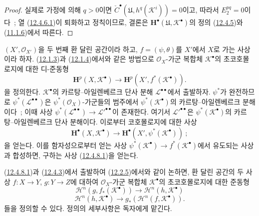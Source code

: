\begin{proof}
실제로 가정에 의해 $q>0$이면
$\check C^\bullet(\mathfrak U,h^q(\mathcal K^i))=0$이고, 따라서
$E_2^{pq}=0$이다~; 열 (\hyperref[0.12.4.6.1-fr]{12.4.6.1})이 퇴화하고
정칙이므로, 결론은 $\mathbf H^\bullet(\mathfrak U,\mathcal K^\bullet)$의
정의 (\hyperref[0.12.4.5-fr]{12.4.5})와
(\hyperref[0.11.1.6-fr]{11.1.6})에서 따른다.
\end{proof}

\begin{env}[12.4.8]
\label{0.12.4.8-fr}
$(X',\mathcal O_{X'})$을 두 번째 환 달린 공간이라 하고,
$f=(\psi,\theta)$를 $X'$에서 $X$로 가는 사상이라 하자.
(\hyperref[0.12.1.3-fr]{12.1.3})과
(\hyperref[0.12.1.4-fr]{12.1.4})에서와 같은 방법으로
$\mathcal O_X$-가군 복합체 $\mathcal K^\bullet$의 초코호몰로지에 대한
디-준동형
\begin{equation}
\label{0.12.4.8.1-fr}
\tag{12.4.8.1}
\mathbf H^p(X,\mathcal K^\bullet)
\longrightarrow\mathbf H^p(X',f^*(\mathcal K^\bullet)).
\end{equation}
을 정의한다. $\mathcal K^\bullet$의 카르탕--아일렌베르크 단사 분해
$\mathcal L^{\bullet\bullet}$에서 출발하자. $\psi^*$가 완전하므로
$\psi^*(\mathcal L^{\bullet\bullet})$은 $\psi^*(\mathcal O_X)$-가군들의
범주에서 $\psi^*(\mathcal K^\bullet)$의 카르탕--아일렌베르크 분해이다~;
이때 사상
$\psi^*(\mathcal L^{\bullet\bullet})\to
\mathcal L'^{\bullet\bullet}$이 존재한다. 여기서
$\mathcal L'^{\bullet\bullet}$은 $\psi^*(\mathcal K^\bullet)$의
카르탕--아일렌베르크 단사 분해이다. 이로부터 코호몰로지에 대한 사상
\[
\mathbf H^\bullet(X,\mathcal K^\bullet)
\longrightarrow\mathbf H^\bullet(X',\psi^*(\mathcal K^\bullet))~;
\]
을 얻는다. 이를 함자성으로부터 얻는 사상
$\psi^*(\mathcal K^\bullet)\to f^*(\mathcal K^\bullet)$에서 유도되는
사상과 합성하면, 구하는 사상
(\hyperref[0.12.4.8.1-fr]{12.4.8.1})을 얻는다.

(\hyperref[0.12.4.8.1-fr]{12.4.8.1})과
(\hyperref[0.12.4.3-fr]{12.4.3})에서 출발하여
(\hyperref[0.12.2.5-fr]{12.2.5})에서와 같이 논하면, 환 달린 공간의
두 사상 $f:X\to Y$, $g:Y\to Z$에 대하여 $\mathcal O_X$-가군 복합체
$\mathcal K^\bullet$의 초코호몰로지에 대한 준동형
\begin{equation}
\label{0.12.4.8.2-fr}
\tag{12.4.8.2}
\mathcal H^n(g,f_*(\mathcal K^\bullet))
\longrightarrow\mathcal H^n(h,\mathcal K^\bullet)
\end{equation}
\begin{equation}
\label{0.12.4.8.3-fr}
\tag{12.4.8.3}
\mathcal H^n(h,\mathcal K^\bullet)
\longrightarrow g_*(\mathcal H^n(f,\mathcal K^\bullet)).
\end{equation}
들을 정의할 수 있다. 정의의 세부사항은 독자에게 맡긴다.
\end{env}

